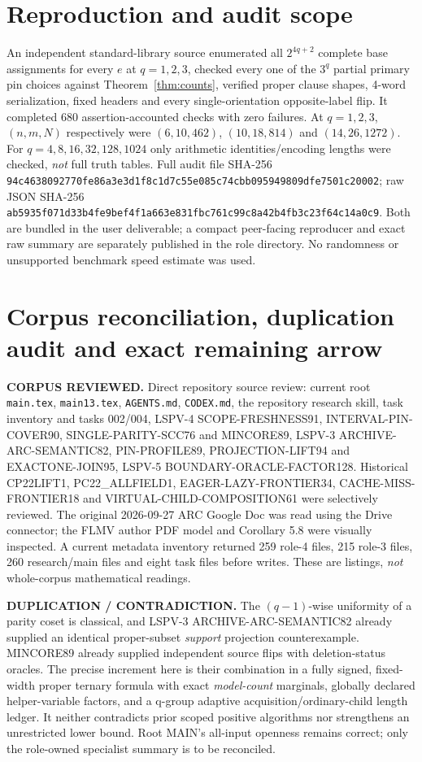 \documentclass[11pt]{article}
\begin{document}
\section{Reproduction and audit scope}
An independent standard-library source enumerated all $2^{4q+2}$ complete base assignments for every $e$ at $q=1,2,3$, checked every one of the $3^q$ partial primary pin choices against Theorem~\ref{thm:counts}, verified proper clause shapes, 4-word serialization, fixed headers and every single-orientation opposite-label flip. It completed 680 assertion-accounted checks with zero failures. At $q=1,2,3$, $(n,m,N)$ respectively were $(6,10,462)$, $(10,18,814)$ and $(14,26,1272)$. For $q=4,8,16,32,128,1024$ only arithmetic identities/encoding lengths were checked, \emph{not} full truth tables. Full audit file SHA-256 \texttt{94c4638092770fe86a3e3d1f8c1d7c55e085c74cbb095949809dfe7501c20002}; raw JSON SHA-256 \texttt{ab5935f071d33b4fe9bef4f1a663e831fbc761c99c8a42b4fb3c23f64c14a0c9}. Both are bundled in the user deliverable; a compact peer-facing reproducer and exact raw summary are separately published in the role directory. No randomness or unsupported benchmark speed estimate was used.

\section{Corpus reconciliation, duplication audit and exact remaining arrow}
\textbf{CORPUS REVIEWED.} Direct repository source review: current root \texttt{main.tex}, \texttt{main13.tex}, \texttt{AGENTS.md}, \texttt{CODEX.md}, the repository research skill, task inventory and tasks 002/004, LSPV-4 SCOPE-FRESHNESS91, INTERVAL-PIN-COVER90, SINGLE-PARITY-SCC76 and MINCORE89, LSPV-3 ARCHIVE-ARC-SEMANTIC82, PIN-PROFILE89, PROJECTION-LIFT94 and EXACTONE-JOIN95, LSPV-5 BOUNDARY-ORACLE-FACTOR128. Historical CP22LIFT1, PC22\_ALLFIELD1, EAGER-LAZY-FRONTIER34, CACHE-MISS-FRONTIER18 and VIRTUAL-CHILD-COMPOSITION61 were selectively reviewed. The original 2026-09-27 ARC Google Doc was read using the Drive connector; the FLMV author PDF model and Corollary 5.8 were visually inspected. A current metadata inventory returned 259 role-4 files, 215 role-3 files, 260 research/main files and eight task files before writes. These are listings, \emph{not} whole-corpus mathematical readings.

\textbf{DUPLICATION / CONTRADICTION.} The $(q-1)$-wise uniformity of a parity coset is classical, and LSPV-3 ARCHIVE-ARC-SEMANTIC82 already supplied an identical proper-subset \emph{support} projection counterexample. MINCORE89 already supplied independent source flips with deletion-status oracles. The precise increment here is their combination in a fully signed, fixed-width proper ternary formula with exact \emph{model-count} marginals, globally declared helper-variable factors, and a q-group adaptive acquisition/ordinary-child length ledger. It neither contradicts prior scoped positive algorithms nor strengthens an unrestricted lower bound. Root MAIN's all-input openness remains correct; only the role-owned specialist summary is to be reconciled.
\end{document}
